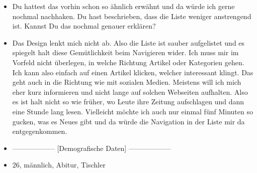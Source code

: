{\begin{itemize}[]
                  Es muss ebenfalls angenehm zum Lesen sein und das Farbschema muss stimmen.
            \item {} Du hattest das vorhin schon so ähnlich erwähnt und da würde ich gerne nochmal nachhaken.
                  Du hast beschrieben, dass die Liste weniger anstrengend ist.
                  Kannst Du das nochmal genauer erklären?
            \item {} Das Design lenkt mich nicht ab.
                  Also die Liste ist sauber aufgelistet und es spiegelt halt diese Gemütlichkeit beim Navigieren wider.
                  Ich muss mir im Vorfeld nicht überlegen, in welche Richtung Artikel oder Kategorien gehen.
                  Ich kann also einfach auf einen Artikel klicken, welcher interessant klingt.
                  Das geht auch in die Richtung wie mit sozialen Medien.
                  Meistens will ich mich eher kurz informieren und nicht lange auf solchen Webseiten aufhalten.
                  Also es ist halt nicht so wie früher, wo Leute ihre Zeitung aufschlagen und dann eine Stunde lang lesen.
                  Vielleicht möchte ich auch nur einmal fünf Minuten so gucken, was es Neues gibt und da würde die Navigation in der Liste mir da entgegenkommen.
            \item {------------------} [Demografische Daten] {------------------}
            \item {} 26, männlich, Abitur, Tischler
      \end{itemize}}
\nolinenumbers

